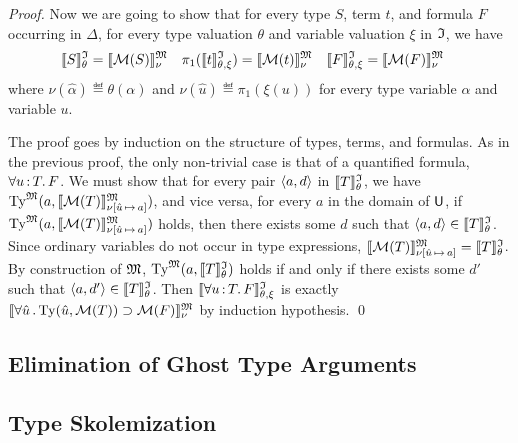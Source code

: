 \begin{proof}
Now we are going to show that for every type $S$, term $t$,
and formula $F$ occurring in $\Delta$,
for every type valuation $\theta$ and variable valuation $\xi$ in $\mathfrak{I}$,
we have
\begin{align*}
\llbracket S \rrbracket^{\mathfrak{I}}_{\theta} &= \llbracket \mathcal{M}(S) \rrbracket^{\mathfrak{M}}_{\nu} &
\pi_1(\llbracket t \rrbracket^{\mathfrak{I}}_{\theta,\xi}) &= \llbracket \mathcal{M}(t) \rrbracket^{\mathfrak{M}}_{\nu} &
\llbracket F \rrbracket^{\mathfrak{I}}_{\theta,\xi} &= \llbracket \mathcal{M}(F) \rrbracket^{\mathfrak{M}}_{\nu}
\end{align*}
where $\nu(\hat{\alpha}) \eqdef \theta(\alpha)$ and
$\nu(\hat{u}) \eqdef \pi_1(\xi(u))$
for every type variable $\alpha$ and variable $u$.

The proof goes by induction on the structure
of types, terms, and formulas. As in the previous proof,
the only non-trivial case is
that of a quantified formula, $\forall u \operatorname{:} T .\, F$.
We must show that for every pair $\langle a,d \rangle$
in $\llbracket T \rrbracket^{\mathfrak{I}}_\theta$, we have
$\mathrm{Ty}^{\mathfrak{M}}(a, \llbracket \mathcal{M}(T) \rrbracket^{\mathfrak{M}}_{\nu[\hat{u}\,\mapsto\,a]})$,
and vice versa, for every $a$ in the domain of $\mathsf{U}$, if
$\mathrm{Ty}^{\mathfrak{M}}(a, \llbracket \mathcal{M}(T) \rrbracket^{\mathfrak{M}}_{\nu[\hat{u}\,\mapsto\,a]})$
holds, then there exists some $d$ such that $\langle a,d \rangle \in
\llbracket T \rrbracket^{\mathfrak{I}}_\theta$.
%
Since ordinary variables do not occur in type expressions,
$\llbracket \mathcal{M}(T) \rrbracket^{\mathfrak{M}}_{\nu[\hat{u}\,\mapsto\,a]} =
\llbracket T \rrbracket^{\mathfrak{I}}_\theta$.
By construction of $\mathfrak{M}$,
$\mathrm{Ty}^{\mathfrak{M}}(a, \llbracket T \rrbracket^{\mathfrak{I}}_\theta)$
holds if and only if there exists some $d'$ such that
$\langle a,d' \rangle \in \llbracket T \rrbracket^{\mathfrak{I}}_\theta$.
%
Then
$\llbracket \forall u \operatorname{:} T .\, F \rrbracket^{\mathfrak{I}}_{\theta,\xi}$
is exactly
$\llbracket \forall \hat{u} \,.\, \mathrm{Ty}(\hat{u},\mathcal{M}(T))
\supset \mathcal{M}(F) \rrbracket^{\mathfrak{M}}_{\nu}$ by induction hypothesis.
\qed
\end{proof}

\subsection{Elimination of Ghost Type Arguments} \label{ssec:ghost}
\subsection{Type Skolemization} \label{ssec:skol}


